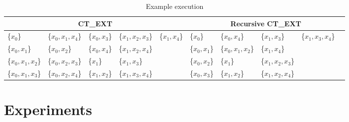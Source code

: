 \documentclass[citeauthoryear]{llncs}
\begin{document}
	\begin{table}[!htb]\label{tab:run}\scriptsize
		\setlength{\tabcolsep}{.05em}
		\caption{Example execution}
      	\centering
    		\begin{tabular}{|lllll|lllll|}
    		\hline
    		\multicolumn{5}{|c|}{CT\_EXT} & \multicolumn{5}{c|}{Recursive CT\_EXT}\\
    		\hline
    		\{$ x_0$\} 	 		& \{$x_0,x_1,x_4$\}	& \{$x_0,x_3$\}		& \{$x_1,x_2,x_3$\}	& \{$x_1,x_4$\}	
    		& \{$x_0$\}			& \{$x_0,x_4$\} 		& \{$x_1,x_3$\} 		& \{$x_1,x_3,x_4$\}	&\\
    		\{$x_0,x_1$\} 		& \{$x_0,x_2$\}  	& \{$x_0,x_4$\}		& \{$x_1,x_2,x_4$\}	& 
    		& \{$x_0,x_1$\}		& \{$x_0,x_1,x_2$\} 	& \{$x_1,x_4$\}		&&\\
    		\{$x_0,x_1,x_2$\}	& \{$x_0,x_2,x_3$\}	& \{$x_1$\}			& \{$x_1,x_3$\}	  	&			
    		& \{$x_0,x_2$\} 		& \{$x_1$\}		 	& \{$x_1,x_2,x_3$\}	&&\\
    		\{$x_0,x_1,x_3$\} 	& \{$x_0,x_2,x_4$\}	& \{$x_1,x_2$\} 		& \{$x_1,x_3,x_4$\}	&			
    		& \{$x_0,x_3$\} 		& \{$x_1,x_2$\}	 	& \{$x_1,x_2,x_4$\}	&&\\
    		\hline
		\end{tabular}
	\end{table}
%
\section{Experiments}
%
%
\end{document}
